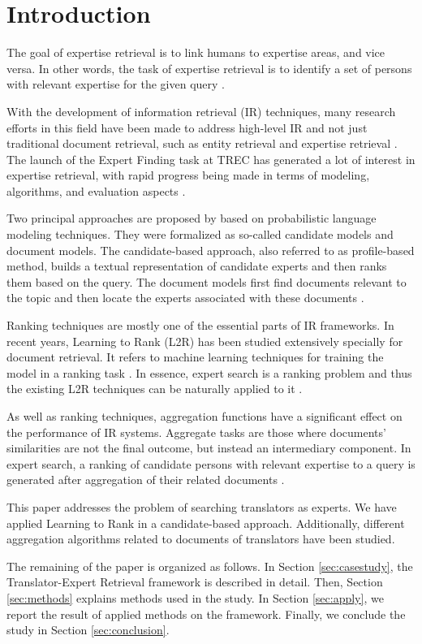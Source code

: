 \section{Introduction}
\label{sec:introduction}
The goal of expertise retrieval is to link humans to expertise areas, and vice versa. In other words, the task of expertise retrieval is to identify a set of persons with relevant expertise for the given query \citep{er, er-community-aware}.

With the development of information retrieval (IR) techniques, many research efforts in this field have been made to address high-level IR and not just traditional document retrieval, such as entity retrieval and expertise retrieval \citep{er-sparse}. The launch of the Expert Finding task at TREC has generated a lot of interest in expertise retrieval, with rapid progress being made in terms of modeling, algorithms, and evaluation aspects \citep{trec2005, er-community-aware}.

Two principal approaches are proposed by \citet{trec2005} based on probabilistic language modeling techniques. They were formalized as so-called candidate models and document models. The candidate-based approach, also referred to as profile-based method, builds a textual representation of candidate experts and then ranks them based on the query. The document models first find documents relevant to the topic and then locate the experts associated with these documents \citep{er}.

Ranking techniques are mostly one of the essential parts of IR frameworks. In recent years, Learning to Rank (L2R) has been studied extensively specially for document retrieval. It refers to machine learning techniques for training the model in a ranking task \citep{er}. In essence, expert search is a ranking problem and thus the existing L2R techniques can be naturally applied to it \citep{l2r-intro}.

As well as ranking techniques, aggregation functions have a significant effect on the performance of IR systems. Aggregate tasks are those where documents' similarities are not
the final outcome, but instead an intermediary component. In expert search, a ranking of candidate persons with relevant expertise to a query is generated after aggregation of their related documents \citep{agg-learning}.

This paper addresses the problem of searching translators as experts. We have applied Learning to Rank in a candidate-based approach. Additionally, different aggregation algorithms related to documents of translators have been studied.

The remaining of the paper is organized as follows. In Section \ref{sec:casestudy}, the Translator-Expert Retrieval framework is described in detail. Then, Section \ref{sec:methods} explains methods used in the study. In Section \ref{sec:apply}, we report the result of applied methods on the framework. Finally, we conclude the study in Section \ref{sec:conclusion}.
